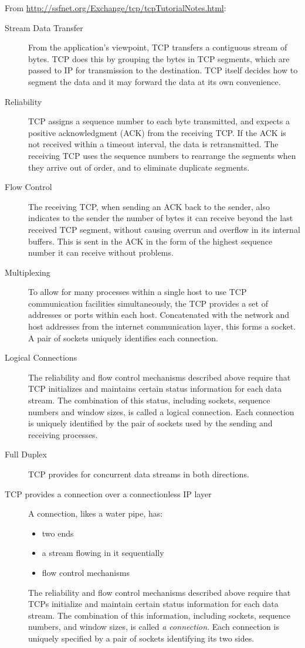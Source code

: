 From \url{http://ssfnet.org/Exchange/tcp/tcpTutorialNotes.html}:
\begin{description}
\item[Stream Data Transfer] From the application's viewpoint, TCP transfers a contiguous
  stream of bytes. TCP does this by grouping the bytes in TCP segments, which are passed
  to IP for transmission to the destination. TCP itself decides how to segment the data
  and it may forward the data at its own convenience.
\item[Reliability] TCP assigns a sequence number to each byte transmitted, and expects a
  positive acknowledgment (ACK) from the receiving TCP. If the ACK is not received within
  a timeout interval, the data is retransmitted. The receiving TCP uses the sequence
  numbers to rearrange the segments when they arrive out of order, and to eliminate
  duplicate segments.
\item[Flow Control] The receiving TCP, when sending an ACK back to the sender, also
  indicates to the sender the number of bytes it can receive beyond the last received TCP
  segment, without causing overrun and overflow in its internal buffers. This is sent in
  the ACK in the form of the highest sequence number it can receive without problems.
\item[Multiplexing] To allow for many processes within a single host to use TCP
  communication facilities simultaneously, the TCP provides a set of addresses or ports
  within each host. Concatenated with the network and host addresses from the internet
  communication layer, this forms a socket. A pair of sockets uniquely identifies each
  connection.
\item[Logical Connections] The reliability and flow control mechanisms described above
  require that TCP initializes and maintains certain status information for each data
  stream. The combination of this status, including sockets, sequence numbers and window
  sizes, is called a logical connection. Each connection is uniquely identified by the
  pair of sockets used by the sending and receiving processes.
\item[Full Duplex] TCP provides for concurrent data streams in both directions.
\item[TCP provides a connection over a connectionless IP layer] A connection, likes a water
  pipe, has:
  \begin{itemize}
  \item two ends
  \item a stream flowing in it sequentially
  \item flow control mechanisms
  \end{itemize}

  The reliability and flow control mechanisms described above require that TCPs initialize
  and maintain certain status information for each data stream.  The combination of this
  information, including sockets, sequence numbers, and window sizes, is called \emph{a
    connection}.  Each connection is uniquely specified by a pair of sockets identifying
  its two sides.
\end{description}

